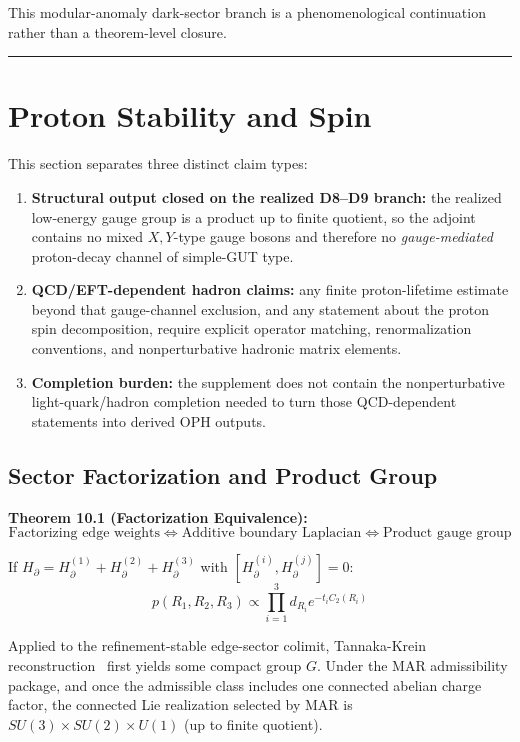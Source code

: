 This modular-anomaly dark-sector branch is a phenomenological continuation rather than a theorem-level closure.

\begin{center}\rule{0.5\linewidth}{0.5pt}\end{center}

\section{Proton Stability and Spin}\label{10-proton-stability-and-spin}

This section separates three distinct claim types:
\begin{enumerate}
\item \textbf{Structural output closed on the realized D8--D9 branch:} the realized low-energy gauge group is a product up to finite quotient, so the adjoint contains no mixed \(X,Y\)-type gauge bosons and therefore no \emph{gauge-mediated} proton-decay channel of simple-GUT type.
\item \textbf{QCD/EFT-dependent hadron claims:} any finite proton-lifetime estimate beyond that gauge-channel exclusion, and any statement about the proton spin decomposition, require explicit operator matching, renormalization conventions, and nonperturbative hadronic matrix elements.
\item \textbf{Completion burden:} the supplement does not contain the nonperturbative light-quark/hadron completion needed to turn those QCD-dependent statements into derived OPH outputs.
\end{enumerate}

\subsection{Sector Factorization and Product Group}\label{101-sector-factorization-and-product-group}

\textbf{Theorem 10.1 (Factorization Equivalence):} \[\text{Factorizing edge weights} \Leftrightarrow \text{Additive boundary Laplacian} \Leftrightarrow \text{Product gauge group}\]

If \(H_\partial = H_\partial^{(1)} + H_\partial^{(2)} + H_\partial^{(3)}\) with \([H_\partial^{(i)}, H_\partial^{(j)}] = 0\): \[p(R_1, R_2, R_3) \propto \prod_{i=1}^3 d_{R_i} e^{-t_i C_2(R_i)}\]

Applied to the refinement-stable edge-sector colimit, Tannaka-Krein reconstruction~\cite{tannaka38,krein49,dr89,dr90} first yields some compact group \(G\). Under the MAR admissibility package, and once the admissible class includes one connected abelian charge factor, the connected Lie realization selected by MAR is \(SU(3) \times SU(2) \times U(1)\) (up to finite quotient).

